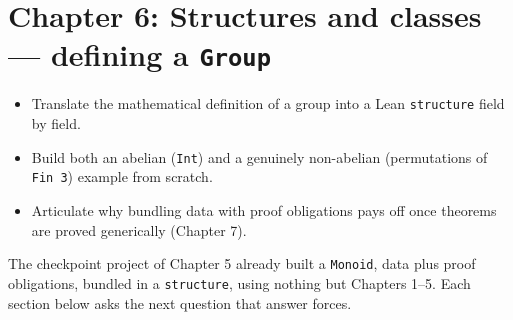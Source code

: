 \chapter{\texorpdfstring{Chapter 6: Structures and classes --- defining a \texttt{Group}}{Chapter 6: Structures and classes --- defining a Group}}\label{sec:06-groups:00-index:1}

\begin{learningobjectives}
\begin{itemize}
\tightlist
\item
  Translate the mathematical definition of a group into a Lean \texttt{structure} field by field.
\item
  Build both an abelian (\texttt{Int}) and a genuinely non-abelian (permutations of \texttt{Fin 3}) example from scratch.
\item
  Articulate why bundling data with proof obligations pays off once theorems are proved generically (Chapter 7).
\end{itemize}
\end{learningobjectives}


The checkpoint project of Chapter 5 already built a \texttt{Monoid}, data plus proof obligations, bundled in a \texttt{structure}, using nothing but Chapters 1--5. Each section below asks the next question that answer forces.

